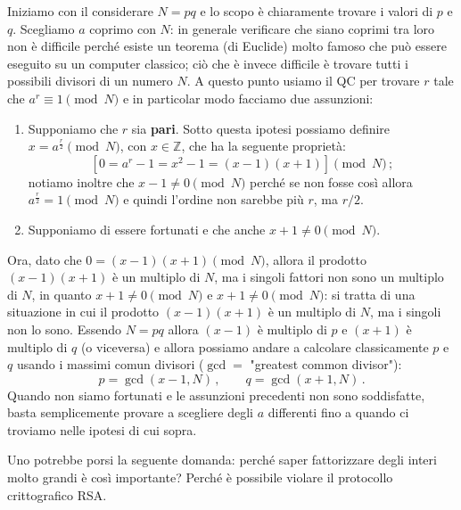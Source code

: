 \noindent Iniziamo con il considerare $N=pq$ e lo scopo è chiaramente trovare i valori di $p$ e $q$. Scegliamo $a$ coprimo con $N$: in generale verificare che siano coprimi tra loro non è difficile perché esiste un teorema (di Euclide) molto famoso che può essere eseguito su un computer classico; ciò che è invece difficile è trovare tutti i possibili divisori di un numero $N$. A questo punto usiamo il QC per trovare $r$ tale che $a^r\equiv1 \pmod N$ e in particolar modo facciamo due assunzioni:
\begin{enumerate}
    \item Supponiamo che $r$ sia \textbf{pari}. Sotto questa ipotesi possiamo definire $x=a^{\frac r2}\pmod N$, con $x \in \mathbb{Z}$, che ha la seguente proprietà:
        \begin{equation*}
            \left[ 0 =a^r-1 = x^2-1=(x-1)(x+1) \right] \pmod N \, ;
        \end{equation*}
        notiamo inoltre che $x-1\neq 0\pmod N$ perché se non fosse così allora $a^\frac r2 =1 \pmod N$ e quindi l'ordine non sarebbe più $r$, ma $r/2$.
    \item Supponiamo di essere fortunati e che anche $x+1\neq 0 \pmod N$.
\end{enumerate}
Ora, dato che $0 = (x-1)(x+1) \pmod N$, allora il prodotto $(x-1)(x+1)$ è un multiplo di $N$, ma i singoli fattori non sono un multiplo di $N$, in quanto $x+1 \neq 0 \pmod N$ e $x+1  \neq 0 \pmod N$: si tratta di una situazione in cui il prodotto $(x-1)(x+1)$ è un multiplo di $N$, ma i singoli non lo sono. Essendo $N = pq$ allora $(x-1)$ è multiplo di $p$ e $(x+1)$ è multiplo di $q$ (o viceversa) e allora possiamo andare a calcolare classicamente $p$ e $q$ usando i massimi comun divisori ($\gcd = $ "greatest common divisor"): 
\begin{equation*}
    p=\gcd{(x-1,N)} \, , \qquad q=\gcd{(x+1,N)} \, .
\end{equation*}
Quando non siamo fortunati e le assunzioni precedenti non sono soddisfatte, basta semplicemente provare a scegliere degli $a$ differenti fino a quando ci troviamo nelle ipotesi di cui sopra. 

\noindent Uno potrebbe porsi la seguente domanda: perché saper fattorizzare degli interi molto grandi è così importante? Perché è possibile violare il protocollo crittografico RSA. 

